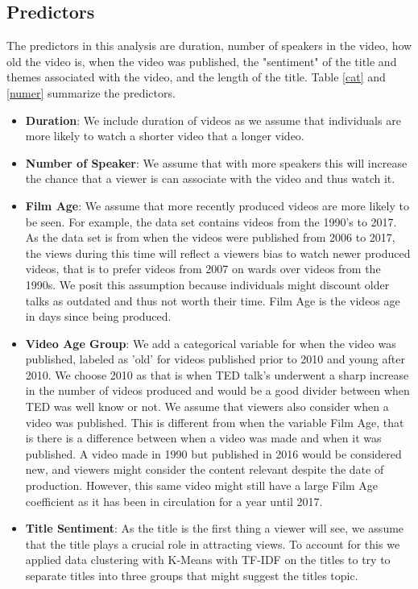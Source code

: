 \subsection{Predictors}
The predictors in this analysis are duration, number of speakers in the video, how old the video is, when the video was published, the "sentiment" of the title and themes associated with the video, and the length of the title. Table \ref{cat} and \ref{numer} summarize the predictors.
\begin{itemize}
	\item \textbf{Duration}: We include duration of videos as we assume that individuals are more likely to watch a shorter video that a longer video.
	\item \textbf{Number of Speaker}: We assume that with more speakers this will increase the chance that a viewer is can associate with the video and thus watch it. 
	\item \textbf{Film Age}: We assume that more recently produced videos are more likely to be seen. For example, the data set contains videos from the 1990's to 2017.  As the data set is from when the videos were published from 2006 to 2017, the views during this time will reflect a viewers bias to watch newer produced videos, that is to prefer videos from 2007 on wards over videos from the 1990s. We posit this assumption because individuals might discount older talks as outdated and thus not worth their time. Film Age is the videos age in days since being produced.
	\item \textbf{Video Age Group}: We add a categorical variable for when the video was published, labeled as 'old' for videos published prior to 2010 and young after 2010. We choose 2010 as that is when TED talk's underwent a sharp increase in the number of videos produced and would be a good divider between when TED was well know or not. We assume that viewers also consider when a video was published. This is different from when the variable Film Age, that is there is a difference between when a video was made and when it was published. A video made in 1990 but published in 2016 would be considered new, and viewers might consider the content relevant despite the date of production. However, this same video might still have a large Film Age coefficient as it has been in circulation for a year until 2017.  
	\item \textbf{Title Sentiment}: As the title is the first thing a viewer will see, we assume that the title plays a crucial role in attracting views. To account for this we applied data clustering with K-Means with TF-IDF on the titles to try to separate titles into three groups that might suggest the titles topic.

\end{itemize}
